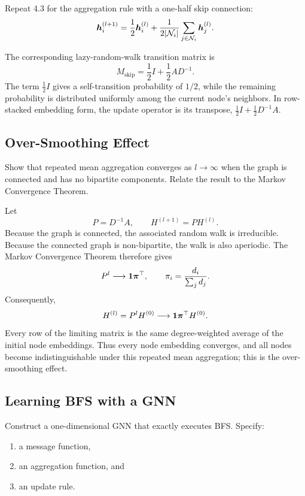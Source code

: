 Repeat 4.3 for the aggregation rule with a one-half skip connection:
\[
  \bm{h}_i^{(l+1)}
  = \frac{1}{2}\bm{h}_i^{(l)}
  + \frac{1}{2|\mathcal{N}_i|}
    \sum_{j\in\mathcal{N}_i}\bm{h}_j^{(l)}.
\]

\begin{solution}
The corresponding lazy-random-walk transition matrix is
\[
  \boxed{M_{\mathrm{skip}}=\frac12 I+\frac12 AD^{-1}}.
\]
The term $\tfrac12 I$ gives a self-transition probability of $1/2$, while the
remaining probability is distributed uniformly among the current node's
neighbors.  In row-stacked embedding form, the update operator is its
transpose, $\tfrac12 I+\tfrac12D^{-1}A$.
\end{solution}

\subsection{Over-Smoothing Effect}

Show that repeated mean aggregation converges as $l\to\infty$ when the graph is
connected and has no bipartite components. Relate the result to the Markov
Convergence Theorem.

\begin{solution}
Let
\[
  P=D^{-1}A,
  \qquad H^{(l+1)}=PH^{(l)}.
\]
Because the graph is connected, the associated random walk is irreducible.
Because the connected graph is non-bipartite, the walk is also aperiodic.
The Markov Convergence Theorem therefore gives
\[
  P^l\longrightarrow \bm{1}\bm{\pi}^\top,
  \qquad
  \pi_i=\frac{d_i}{\sum_j d_j}.
\]
Consequently,
\[
  H^{(l)}=P^lH^{(0)}
  \longrightarrow
  \bm{1}\bm{\pi}^\top H^{(0)}.
\]
Every row of the limiting matrix is the same degree-weighted average of the
initial node embeddings.  Thus every node embedding converges, and all nodes
become indistinguishable under this repeated mean aggregation; this is the
over-smoothing effect.
\end{solution}

\subsection{Learning BFS with a GNN}

Construct a one-dimensional GNN that exactly executes BFS. Specify:
\begin{enumerate}[label=(\alph*)]
  \item a message function,
  \item an aggregation function, and
  \item an update rule.
\end{enumerate}

